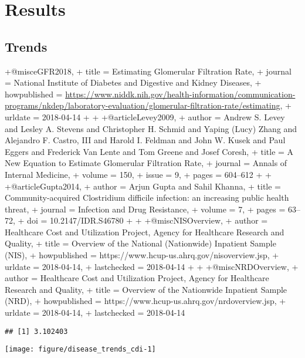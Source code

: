 \chapter{Results}

\section{Trends}
+@misc{eGFR2018,
+  title        = {Estimating Glomerular Filtration Rate},
+  journal      = {National Institute of Diabetes and Digestive and Kidney Diseases},
+  howpublished = {\url{https://www.niddk.nih.gov/health-information/communication-programs/nkdep/laboratory-evaluation/glomerular-filtration-rate/estimating}},
+  urldate       = {2018-04-14}
+}
+
+@article{Levey2009,
+  author       = {Andrew S. Levey and Lesley A. Stevens and Christopher H. Schmid and Yaping (Lucy) Zhang and Alejandro F. Castro, III and Harold I. Feldman and John W. Kusek and Paul Eggers and Frederick Van Lente and Tom Greene and Josef Coresh},
+  title        = {A New Equation to Estimate Glomerular Filtration Rate},
+  journal      = {Annals of Internal Medicine},
+  volume       = {150},
+  issue        = {9},
+  pages        = {604–612}
+}
+
+@article{Gupta2014,
+  author       = {Arjun Gupta and Sahil Khanna},
+  title        = {Community-acquired Clostridium difficile infection: an increasing public health threat},
+  journal      = {Infection and Drug Resistance},
+  volume       = {7},
+  pages        = {63–72},
+  doi          = {10.2147/IDR.S46780}
+}
+
+@misc{NISOverview,
+  author        = {{Healthcare Cost and Utilization Project, Agency for Healthcare Research and Quality}},
+  title         = {Overview of the National (Nationwide) Inpatient Sample ({NIS})},
+  howpublished  = {https://www.hcup-us.ahrq.gov/nisoverview.jsp},
+  urldate       = {2018-04-14},
+  lastchecked   = {2018-04-14}
+}
+
+@misc{NRDOverview,
+  author        = {{Healthcare Cost and Utilization Project, Agency for Healthcare Research and Quality}},
+  title         = {Overview of the Nationwide Inpatient Sample ({NRD})},
+  howpublished  = {https://www.hcup-us.ahrq.gov/nrdoverview.jsp},
+  urldate       = {2018-04-14},
+  lastchecked   = {2018-04-14}
 }
\begin{knitrout}
\color{fgcolor}\begin{kframe}


{\ttfamily\noindent\itshape\color{messagecolor}{\#\# Parsed with column specification:\\\#\# cols(\\\#\#\ \  disease = col\_character(),\\\#\#\ \  year = col\_double(),\\\#\#\ \  theta = col\_double(),\\\#\#\ \  ci2.5 = col\_double(),\\\#\#\ \  ci97.5 = col\_double()\\\#\# )}}\begin{verbatim}
## [1] 3.102403
\end{verbatim}
\end{kframe}
\texttt{[image: figure/disease\_trends\_cdi-1]} 

\end{knitrout}
